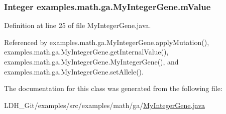 \hypertarget{classexamples_1_1math_1_1ga_1_1_my_integer_gene_a78c8e8d11e0177367a038a7b33982f5f}{
\subsubsection[{m\-Value}]{\setlength{\rightskip}{0pt plus 5cm}Integer examples.\-math.\-ga.\-My\-Integer\-Gene.\-m\-Value\hspace{0.3cm}{\ttfamily [private]}}}\label{classexamples_1_1math_1_1ga_1_1_my_integer_gene_a78c8e8d11e0177367a038a7b33982f5f}


Definition at line 25 of file My\-Integer\-Gene.\-java.



Referenced by examples.\-math.\-ga.\-My\-Integer\-Gene.\-apply\-Mutation(), examples.\-math.\-ga.\-My\-Integer\-Gene.\-get\-Internal\-Value(), examples.\-math.\-ga.\-My\-Integer\-Gene.\-My\-Integer\-Gene(), and examples.\-math.\-ga.\-My\-Integer\-Gene.\-set\-Allele().



The documentation for this class was generated from the following file\-:\begin{DoxyCompactItemize}
\item 
L\-D\-H\-\_\-\-Git/examples/src/examples/math/ga/\hyperlink{_my_integer_gene_8java}{My\-Integer\-Gene.\-java}\end{DoxyCompactItemize}
